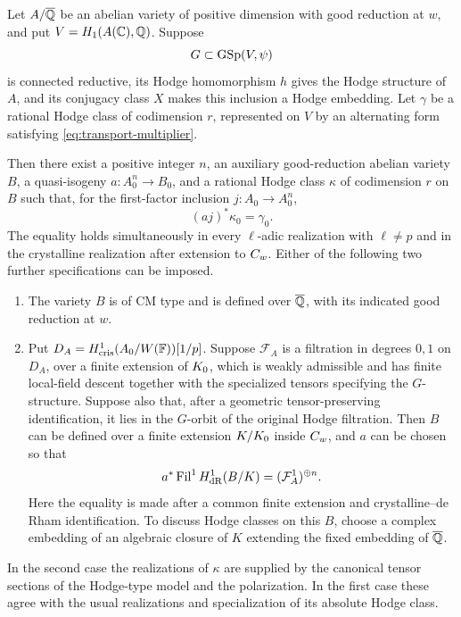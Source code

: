 \begin{proposition}[Transport]
\label{prop:transport}
Let $A/\overline{\mathbb Q}$ be an abelian variety of positive dimension with good
reduction at $w$, and put $V=H_1(A(\mathbb C),\mathbb Q)$. Suppose
\[
 G\subset\operatorname{GSp}(V,\psi)
\]
is connected reductive, its Hodge homomorphism $h$ gives the
Hodge structure of $A$, and its conjugacy class $X$ makes this
inclusion a Hodge embedding. Let $\gamma$ be a rational Hodge
class of codimension $r$, represented on $V$ by an alternating
form satisfying \eqref{eq:transport-multiplier}.

Then there exist a positive integer $n$, an auxiliary
good-reduction abelian variety $B$, a quasi-isogeny
$a:A_0^n\to B_0$, and a rational Hodge class $\kappa$ of
codimension $r$ on $B$ such that, for the first-factor inclusion
$j:A_0\to A_0^n$,
\begin{equation}
 (aj)^*\kappa_0=\gamma_0.
 \label{eq:transport-class}
\end{equation}
The equality holds simultaneously in every $\ell$-adic
realization with $\ell\ne p$ and in the crystalline realization
after extension to $C_w$. Either of the following two further
specifications can be imposed.
\begin{enumerate}
\item The variety $B$ is of CM type and is defined over $\overline{\mathbb Q}$,
with its indicated good reduction at $w$.
\item Put $D_A=H^1_{\mathrm{cris}}(A_0/W(\mathbb F))[1/p]$. Suppose
$\mathcal F_A$ is a filtration in degrees $0,1$ on $D_A$, over a
finite extension of $K_0$, which is weakly admissible and has
finite local-field descent together with the specialized tensors
specifying the $G$-structure. Suppose
also that, after a geometric tensor-preserving identification, it
lies in the $G$-orbit of the original Hodge filtration. Then $B$
can be defined over a finite extension $K/K_0$ inside $C_w$,
and $a$ can be chosen so that
\begin{equation}
 a^*\operatorname{Fil}^1H^1_{\mathrm{dR}}(B/K)
       =(\mathcal F_A^1)^{\oplus n}.
 \label{eq:transport-prescribed-filtration}
\end{equation}
Here the equality is made after a common finite extension and
crystalline--de Rham identification. To discuss Hodge classes on
this $B$, choose a complex embedding of an algebraic closure of
$K$ extending the fixed embedding of $\overline{\mathbb Q}$.
\end{enumerate}
In the second case the realizations of $\kappa$ are supplied by
the canonical tensor sections of the Hodge-type model and the
polarization. In the first case these agree with the usual
realizations and specialization of its absolute Hodge class.
\end{proposition}

